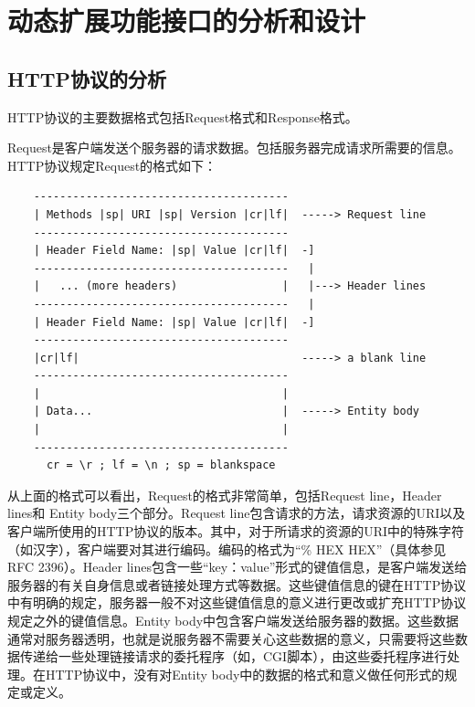 \documentclass[twoside, xetex]{report}
\begin{document}
\section{动态扩展功能接口的分析和设计}
\subsection{HTTP协议的分析}
	HTTP协议的主要数据格式包括Request格式和Response格式。
	
	Request是客户端发送个服务器的请求数据。包括服务器完成请求所需要的信息。HTTP协议规定Request的格式如下：
\begin{verbatim}
    ---------------------------------------
    | Methods |sp| URI |sp| Version |cr|lf|  -----> Request line
    ---------------------------------------
    | Header Field Name: |sp| Value |cr|lf|  -]
    ---------------------------------------   |
    |   ... (more headers)                |   |---> Header lines
    ---------------------------------------   |
    | Header Field Name: |sp| Value |cr|lf|  -]
    ---------------------------------------
    |cr|lf|                                  -----> a blank line
    ---------------------------------------
    |                                     |
    | Data...                             |  -----> Entity body
    |                                     |
    ---------------------------------------
      cr = \r ; lf = \n ; sp = blankspace
\end{verbatim}
 	从上面的格式可以看出，Request的格式非常简单，包括Request line，Header lines和 Entity body三个部分。Request line包含请求的方法，请求资源的URI以及客户端所使用的HTTP协议的版本。其中，对于所请求的资源的URI中的特殊字符（如汉字），客户端要对其进行编码。编码的格式为“\% HEX HEX”（具体参见RFC 2396）。Header lines包含一些“key：value”形式的键值信息，是客户端发送给服务器的有关自身信息或者链接处理方式等数据。这些键值信息的键在HTTP协议中有明确的规定，服务器一般不对这些键值信息的意义进行更改或扩充HTTP协议规定之外的键值信息。Entity body中包含客户端发送给服务器的数据。这些数据通常对服务器透明，也就是说服务器不需要关心这些数据的意义，只需要将这些数据传递给一些处理链接请求的委托程序（如，CGI脚本），由这些委托程序进行处理。在HTTP协议中，没有对Entity body中的数据的格式和意义做任何形式的规定或定义。
 	
\end{document}
